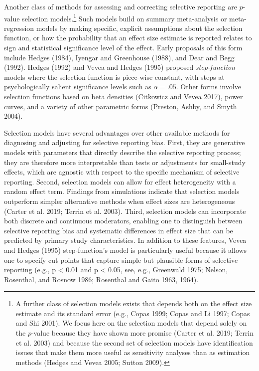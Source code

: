 \documentclass[
]{article}
\begin{document}
Another class of methods for assessing and correcting selective
reporting are \(p\)-value selection models.\footnote{A further class of
  selection models exists that depends both on the effect size estimate
  and its standard error (e.g., Copas 1999; Copas and Li 1997; Copas and
  Shi 2001). We focus here on the selection models that depend solely on
  the \(p\)-value because they have shown more promise (Carter et al.
  2019; Terrin et al. 2003) and because the second set of selection
  models have identification issues that make them more useful as
  sensitivity analyses than as estimation methods (Hedges and Vevea
  2005; Sutton 2009).} Such models build on summary meta-analysis or
meta-regression models by making specific, explicit assumptions about
the selection function, or how the probability that an effect size
estimate is reported relates to sign and statistical significance level
of the effect. Early proposals of this form include Hedges (1984),
Iyengar and Greenhouse (1988), and Dear and Begg (1992). Hedges (1992)
and Vevea and Hedges (1995) proposed \emph{step-function} models where
the selection function is piece-wise constant, with steps at
psychologically salient significance levels such as \(\alpha = .05\).
Other forms involve selection functions based on beta densities
(Citkowicz and Vevea 2017), power curves, and a variety of other
parametric forms (Preston, Ashby, and Smyth 2004).

Selection models have several advantages over other available methods
for diagnosing and adjusting for selective reporting bias. First, they
are generative models with parameters that directly describe the
selective reporting process; they are therefore more interpretable than
tests or adjustments for small-study effects, which are agnostic with
respect to the specific mechanism of selective reporting. Second,
selection models can allow for effect heterogeneity with a random effect
term. Findings from simulations indicate that selection models
outperform simpler alternative methods when effect sizes are
heterogeneous (Carter et al. 2019; Terrin et al. 2003). Third, selection
models can incorporate both discrete and continuous moderators, enabling
one to distinguish between selective reporting bias and systematic
differences in effect size that can be predicted by primary study
characteristics. In addition to these features, Vevea and Hedges (1995)
step-function's model is particularly useful because it allows one to
specify cut points that capture simple but plausible forms of selective
reporting (e.g., p \textless{} 0.01 and p \textless{} 0.05, see, e.g.,
Greenwald 1975; Nelson, Rosenthal, and Rosnow 1986; Rosenthal and Gaito
1963, 1964).
\end{document}
